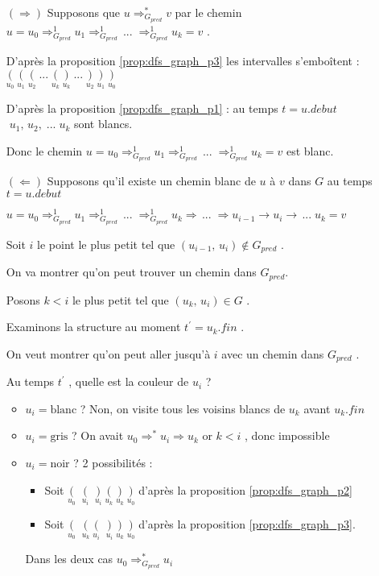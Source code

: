 \begin{itemize}
\item[$(\Rightarrow)$] Supposons que $u \Rightarrow_{G_{pred}}^{\ast} v$ par le chemin $u = u_{0} \Rightarrow_{G_{pred}}^{1} u_{1} \Rightarrow_{G_{pred}}^{1} \,...\; \Rightarrow_{G_{pred}}^{1} u_{k} = v$ .

D'après la proposition \ref{prop:dfs_graph_p3} les intervalles s'emboîtent : $\underset{u_{0}}{(} \; \underset{u_{1}}{(} \; \underset{u_{2}}{(} \; ... \; \underset{u_{k}}{(} \; \underset{u_{k}}{)} \; ... \; \underset{u_{2}}{)} \; \underset{u_{1}}{)} \; \underset{u_{0}}{)}$

D'après la proposition \ref{prop:dfs_graph_p1} : au temps $t = u.debut$ $\;u_{1},\, u_{2},\; ...\; u_{k}$ sont blancs.

Donc le chemin $u = u_{0} \Rightarrow_{G_{pred}}^{1} u_{1} \Rightarrow_{G_{pred}}^{1} \,...\; \Rightarrow_{G_{pred}}^{1} u_{k} = v$ est blanc.

\item[$(\Leftarrow)$] Supposons qu'il existe un chemin blanc de $u$ à $v$ dans $G$ au temps $t = u.debut$

$u = u_{0} \Rightarrow_{G_{pred}}^{1} u_{1} \Rightarrow_{G_{pred}}^{1} \,...\; \Rightarrow_{G_{pred}}^{1} u_{k} \Rightarrow \, ...\; \Rightarrow u_{i-1} \rightarrow u_{i} \rightarrow \,...\; u_{k} = v$

Soit $i$ le point le plus petit tel que $(u_{i - 1},\, u_{i}) \notin G_{pred}$ .

On va montrer qu'on peut trouver un chemin dans $G_{pred}$.

Posons $k < i$ le plus petit tel que $(u_{k},\, u_{i}) \in G$ .

Examinons la structure au moment $t^{\prime} = u_{k}.fin$ .

On veut montrer qu'on peut aller jusqu'à $i$ avec un chemin dans $G_{pred}$ .

Au temps $t^{\prime}$ , quelle est la couleur de $u_{i}$ ?

\begin{itemize}[label=$\bullet$]
\item $u_{i} = \text{blanc}$ ? Non, on visite tous les voisins blancs de $u_{k}$ avant $u_{k}.fin$
\item $u_{i} = \text{gris}$ ? On avait $u_{0} \Rightarrow^{\ast} u_{i} \Rightarrow u_{k}$ or $k < i$ , donc impossible
\item $u_{i} = \text{noir}$ ? 2 possibilités :
\begin{itemize}[label=$\circ$]
\item Soit $\underset{u_{0}}{(} \;\; \underset{u_{i}}{(} \; \; \underset{u_{i}}{)} \; \underset{u_{k}}{(}\; \underset{u_{k}}{)} \; \underset{u_{0}}{)}$ d'après la proposition \ref{prop:dfs_graph_p2}
\item Soit $\underset{u_{0}}{(} \;\; \underset{u_{k}}{(} \; \underset{u_{i}}{(} \; \; \underset{u_{i}}{)} \; \underset{u_{k}}{)} \; \underset{u_{0}}{)}$ d'après la proposition \ref{prop:dfs_graph_p3}.
\end{itemize}
Dans les deux cas $u_{0} \Rightarrow_{G_{pred}}^{\ast} u_{i}$
\end{itemize}
\end{itemize}

